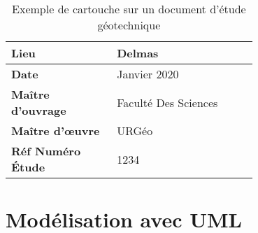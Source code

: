 \par    
\begin{table}
        \centering
        \begin{tabular}{|p{0.30\linewidth}|p{0.40\linewidth}|}
                \hline
                \textbf{Lieu} & Delmas \\
                \hline
                \textbf{Date} & Janvier 2020 \\
                \hline
                \textbf{Maître d'ouvrage} & Faculté Des Sciences \\
                \hline
                \textbf{Maître d'œuvre} & URGéo \\
                \hline
                \textbf{Réf Numéro Étude} & 1234 \\
                \hline
        \end{tabular}
        \caption{Exemple de cartouche sur un document d'étude géotechnique} \label{tab:example_cartouche}
\end{table}
\par

        \section{Modélisation avec UML}
                \lipsum[1]
